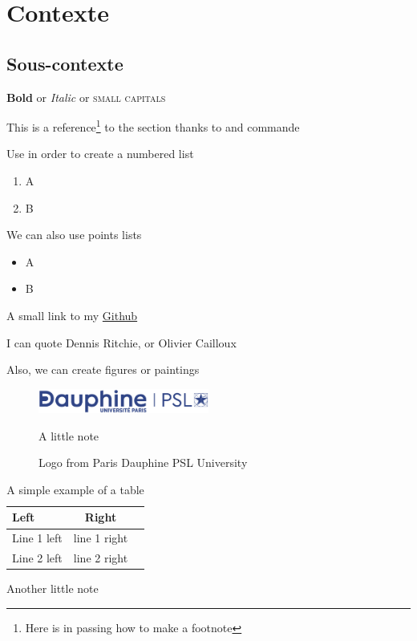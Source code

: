 \section{Contexte}
\label{context}

\subsection{Sous-contexte}

\textbf{Bold} or \textit{Italic} or \textsc{small capitals}

This is a reference\footnote{Here is in passing how to make a footnote} to the  section thanks to  and  commande

\hfill

Use  in order to create a numbered list

\begin{enumerate}
    \item A
    \item B
\end{enumerate}

We can also use points lists

\begin{itemize}
    \item A
    \item B
\end{itemize}

A small link to my \href{https://github.com/av1m}{Github}

I can quote Dennis Ritchie\cite{c-programming}, or Olivier Cailloux\cite{cailloux}

Also, we can create figures or paintings

\begin{figure}[H]
    \centering
	\includegraphics[scale=1,width=0.5\textwidth]{images/dauphine.png}
	\caption{Logo from Paris Dauphine PSL University}
	\footnotesize A little note
	\label{dauphine-logo}
\end{figure}


\begin{table}[h]
    \centering
    \begin{tabular}{|l|c|r|}
      \hline
      \textbf{Left} & \textbf{Right} \\
      \hline
      Line 1 left & line 1 right \\
      Line 2 left & line 2 right \\
      \hline
    \end{tabular}
    \caption{A simple example of a table}
    \label{tab:duree}
    \footnotesize Another little note
\end{table}


